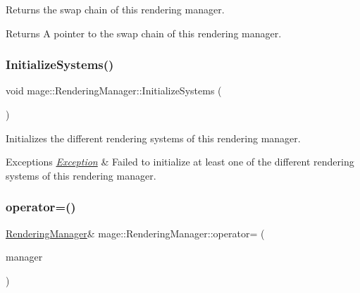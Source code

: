 Returns the swap chain of this rendering manager.

\begin{DoxyReturn}{Returns}
A pointer to the swap chain of this rendering manager. 
\end{DoxyReturn}
\hypertarget{classmage_1_1_rendering_manager_a80812ecd5c9757b961e46e6bb7533566}{}\label{classmage_1_1_rendering_manager_a80812ecd5c9757b961e46e6bb7533566} 
\subsubsection{\texorpdfstring{Initialize\+Systems()}{InitializeSystems()}}
{\footnotesize\ttfamily void mage\+::\+Rendering\+Manager\+::\+Initialize\+Systems (\begin{DoxyParamCaption}{ }\end{DoxyParamCaption})\hspace{0.3cm}{\ttfamily [private]}}

Initializes the different rendering systems of this rendering manager.


\begin{DoxyExceptions}{Exceptions}
{\em \hyperlink{classmage_1_1_exception}{Exception}} & Failed to initialize at least one of the different rendering systems of this rendering manager. \\
\hline
\end{DoxyExceptions}
\hypertarget{classmage_1_1_rendering_manager_a4c0455f5e40f1b1e16e10a133dffc87f}{}\label{classmage_1_1_rendering_manager_a4c0455f5e40f1b1e16e10a133dffc87f} 
\subsubsection{\texorpdfstring{operator=()}{operator=()}\hspace{0.1cm}{\footnotesize\ttfamily [1/2]}}
{\footnotesize\ttfamily \hyperlink{classmage_1_1_rendering_manager}{Rendering\+Manager}\& mage\+::\+Rendering\+Manager\+::operator= (\begin{DoxyParamCaption}\item[{const \hyperlink{classmage_1_1_rendering_manager}{Rendering\+Manager} \&}]{manager }\end{DoxyParamCaption})\hspace{0.3cm}{\ttfamily [delete]}}


